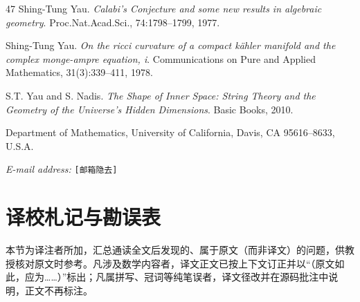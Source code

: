 \documentclass[11pt,a4paper]{article}
\theoremstyle{plain}
\theoremstyle{definition}
\begin{document}
\begin{thebibliography}{47}
 Shing-Tung Yau. \emph{Calabi's Conjecture and some new results in algebraic geometry}. Proc.Nat.Acad.Sci., 74:1798--1799, 1977.

 Shing-Tung Yau. \emph{On the ricci curvature of a compact kähler manifold and the complex monge-ampre equation, i}. Communications on Pure and Applied Mathematics, 31(3):339--411, 1978.

 S.T. Yau and S. Nadis. \emph{The Shape of Inner Space: String Theory and the Geometry of the Universe's Hidden Dimensions}. Basic Books, 2010.

\end{thebibliography}

\medskip
\noindent Department of Mathematics, University of California, Davis, CA 95616--8633, U.S.A.

\noindent\emph{E-mail address:} \texttt{[邮箱隐去]}



\section*{译校札记与勘误表}

\noindent 本节为译注者所加，汇总通读全文后发现的、属于原文（而非译文）的问题，供教授核对原文时参考。凡涉及数学内容者，译文正文已按上下文订正并以“（原文如此，应为……）”标出；凡属拼写、冠词等纯笔误者，译文径改并在源码批注中说明，正文不再标注。
\end{document}
